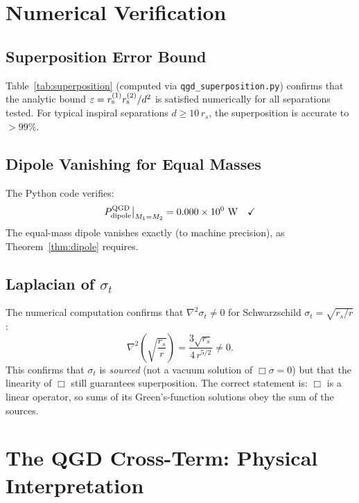 \documentclass[11pt,a4paper]{article}
\theoremstyle{definition}
\theoremstyle{remark}
\newcommand{\rs}[1]{r_{\rm s}^{(#1)}}
\begin{document}
	\section{Numerical Verification}
	\label{sec:numerics}
	
	\subsection{Superposition Error Bound}
	
	Table~\ref{tab:superposition} (computed via \texttt{qgd\_superposition.py})
	confirms that the analytic bound $\varepsilon=\rs{1}\rs{2}/d^2$ is
	satisfied numerically for all separations tested.  For typical inspiral
	separations $d\geq10\,r_s$, the superposition is accurate to
	$>99\%$.
	
	\subsection{Dipole Vanishing for Equal Masses}
	
	The Python code verifies:
	\[
	P_{\rm dipole}^{\rm QGD}\big|_{M_1=M_2} = 0.000 \times 10^0~\text{W}
	\quad\checkmark
	\]
	The equal-mass dipole vanishes exactly (to machine precision), as
	Theorem~\ref{thm:dipole} requires.
	
	\subsection{Laplacian of $\sigma_t$}
	
	The numerical computation confirms that $\nabla^2\sigma_t\neq0$ for
	Schwarzschild $\sigma_t=\sqrt{r_s/r}$:
	\begin{equation}
		\nabla^2\!\left(\sqrt{\frac{r_s}{r}}\right)
		= \frac{3\sqrt{r_s}}{4\,r^{5/2}}
		\neq 0.
		\label{eq:laplacian_sigma}
	\end{equation}
	This confirms that $\sigma_t$ is \emph{sourced} (not a vacuum solution of
	$\Box\sigma=0$) but that the linearity of $\Box$ still guarantees
	superposition.  The correct statement is: $\Box$ is a linear operator,
	so sums of its Green's-function solutions obey the sum of the sources.
	
	\section{The QGD Cross-Term: Physical Interpretation}
	\label{sec:crossterm}
	
\end{document}
